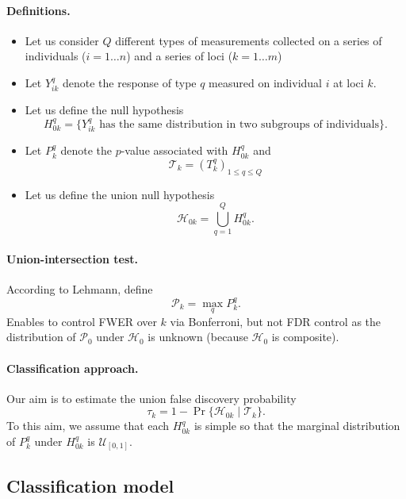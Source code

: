 \documentclass[a4paper, 11pt]{article}
\newcommand{\Hcal}{\mathcal{H}}
\newcommand{\Pcal}{\mathcal{P}}
\newcommand{\Tcal}{\mathcal{T}}
\newcommand{\Ucal}{\mathcal{U}}
\begin{document}
\paragraph{Definitions.}
\begin{itemize}
 \item Let us consider $Q$ different types of measurements collected on a series of individuals ($i = 1 \dots n$) and a series of loci ($k = 1 \dots m$)
 \item Let $Y^q_{ik}$ denote the response of type $q$ measured on individual $i$ at loci $k$.
 \item Let us define the null hypothesis 
 $$
 H^q_{0k} = \{Y^q_{ik} \text{ has the same distribution in two subgroups of individuals}\}.
 $$
 \item Let $P^q_k$ denote the $p$-value associated with $H^q_{0k}$ and 
 $$
 \Tcal_k = (T^q_k)_{1 \leq q \leq Q}
 $$
 \item Let us define the union null hypothesis
 $$
 \Hcal_{0k} = \bigcup^Q_{q=1} H^q_{0k}.
 $$
\end{itemize}

\paragraph{Union-intersection test.} According to Lehmann, define 
$$
\Pcal_k = \max_q P^q_k.
$$
Enables to control FWER over $k$ via Bonferroni, but not FDR control as the distribution of $\Pcal_0$ under $\Hcal_0$ is unknown (because $\Hcal_0$ is composite).

\paragraph{Classification approach.} 
Our aim is to estimate the union false discovery probability
$$
\tau_k = 1 - \Pr\{\Hcal_{0k} \mid \Tcal_k\}.
$$
To this aim, we assume that each $H^q_{0k}$ is simple so that the marginal distribution of $P^q_k$ under $H^q_{0k}$ is $\Ucal_{[0, 1]}$.

\subsection{Classification model}
\end{document}
